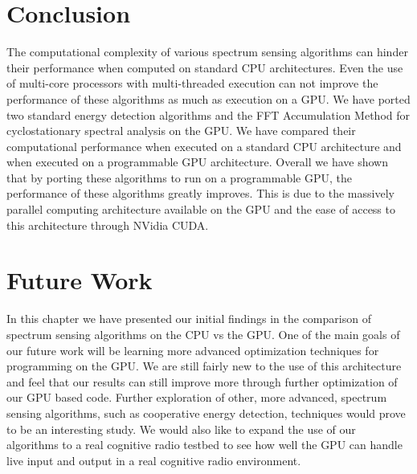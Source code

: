 \section{Conclusion}
\label{sect:gpu_conclusion}
The computational complexity of various spectrum sensing algorithms can hinder their performance when computed on standard CPU architectures.  Even the use of multi-core processors with multi-threaded execution can not improve the performance of these algorithms as much as execution on a GPU.  We have ported two standard energy detection algorithms and the FFT Accumulation Method for cyclostationary spectral analysis on the GPU.  We have compared their computational performance  when executed on a standard CPU architecture and when executed on a programmable GPU architecture.  Overall we have shown that by porting these algorithms to run on a programmable GPU, the performance of these algorithms greatly improves.  This is due to the massively parallel computing architecture available on the GPU and the ease of access to this architecture through NVidia CUDA.


\section{Future Work}
\label{sect:gpu_future_work}
In this chapter we have presented our initial findings in the comparison of spectrum sensing algorithms on the CPU vs the GPU.  One of the main goals of our future work will be learning more advanced optimization techniques for programming on the GPU.  We are still fairly new to the use of this architecture and feel that our results can still improve more through further optimization of our GPU based code.
Further exploration of other, more advanced, spectrum sensing algorithms, such as cooperative energy detection, techniques would prove to be an interesting study.  We would also like to expand the use of our algorithms to a real cognitive radio testbed to see how well the GPU can handle live input and output in a real cognitive radio environment.
